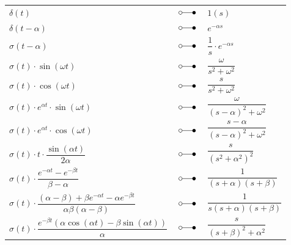 \vline
\begin{minipage}{9cm}
\begin{center}
	\begin{tabular}{p{5cm}p{0.75cm}p{3cm}}
	
		$\delta \left( t \right)$ & $\; \laplace \;$ & $1\left( s \right)$ \\
		
		$\delta \left( t - \alpha \right)$ & $\; \laplace \;$ & $e^{- \alpha s}$\\
		
		$\sigma\left( t - \alpha \right)$ & $\; \laplace \;$ & $ \dfrac{1}{s} \cdot e^{- \alpha s}$\\
		
		$\sigma \left( t \right) \cdot \sin \left(\omega t \right)$ & $\; \laplace \;$ &
		$\dfrac{\omega}{s^2 + {\omega^2}}$\\
		
		$\sigma \left( t \right) \cdot \cos \left( \omega t \right)$ & $\; \laplace \;$ &
		$\dfrac{s}{ s^2 + \omega^2}$\\
		
		$\sigma \left( t \right) \cdot  e^{ \alpha t} \cdot \sin \left(\omega t \right)$ & $\; \laplace \;$ 
		& 	$\dfrac{\omega}{(s-\alpha)^2 + {\omega^2}}$\\
		$\sigma \left( t \right) \cdot e^{ \alpha t} \cdot \cos \left( \omega t \right) $ & $\; \laplace \;$ &
		$\dfrac{s-\alpha}{(s-\alpha)^2 + \omega^2}$\\
		
		$\sigma \left( t \right)\cdot t \cdot \dfrac{\sin \left( \alpha t \right)} { 2 \alpha }$ & $\; \laplace \;$ & $\dfrac{s}{ \left(s^ {2}+ \alpha ^{2} \right)^{2}}$ \\
		
		$\sigma \left( t \right)\cdot \dfrac { e ^ { - \alpha t } - e ^ { - \beta t } } { \beta - \alpha }$ & $\; \laplace \;$ & $\dfrac { 1 } { ( s + \alpha ) ( s + \beta ) }$\\
		
		$\sigma \left( t \right)\cdot \dfrac {(\alpha - \beta) +\beta e ^ { - \alpha t } - \alpha e ^ { - \beta t } } { \alpha \beta (\alpha - \beta) }$ & $\; \laplace \;$ & $\dfrac { 1 } {s ( s + \alpha ) ( s + \beta ) }$\\
		
		$\sigma \left( t \right)\cdot \dfrac { e ^ { - \beta t } ( \alpha \cos ( \alpha t ) - \beta \sin ( \alpha t ) ) } { \alpha }$& $\; \laplace \;$ & $\dfrac { s } { ( s + \beta ) ^ { 2 } + \alpha ^ { 2 } }$\\
		
		 
		
		
	\end{tabular}
\end{center}
\end{minipage}


